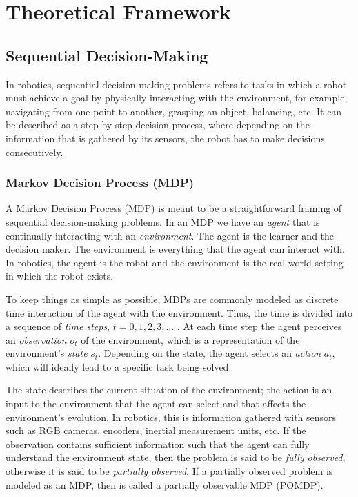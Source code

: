 \chapter{Theoretical Framework}
\section{Sequential Decision-Making}
In robotics, sequential decision-making problems refers to tasks in which a robot must achieve a goal by physically interacting with the environment, for example, navigating from one point to another, grasping an object, balancing, etc. It can be described as a step-by-step decision process, where depending on the information that is gathered by its sensors, the robot has to make decisions consecutively.

\subsection{Markov Decision Process (MDP) \cite{puterman2014markov, sutton2018reinforcement}}
A Markov Decision Process (MDP) is meant to be a straightforward framing of sequential decision-making problems. In an MDP we have an \emph{agent} that is continually interacting with an \emph{environment}. The agent is the learner and the decision maker. The environment is everything that the agent can interact with. In robotics, the agent is the robot and the environment is the real world setting in which the robot exists.

To keep things as simple as possible, MDPs are commonly modeled as discrete time interaction of the agent with the environment. Thus, the time is divided into a sequence of \emph{time steps}, $t=0,1,2,3,...$ . At each time step the agent perceives an \emph{observation} $o_{t}$ of the environment, which is a representation of the environment's \emph{state} $s_{t}$. Depending on the state, the agent selects an \emph{action} $a_{t}$, which will ideally lead to a specific task being solved. 

The state describes the current situation of the environment; the action is an input to the environment that the agent can select and that affects the environment's evolution. In robotics, this is information gathered with sensors such as RGB cameras, encoders, inertial measurement units, etc. If the observation contains sufficient information such that the agent can fully understand the environment state, then the problem is said to be \emph{fully observed}, otherwise it is said to be \emph{partially observed}. If a partially observed problem is modeled as an MDP, then is called a partially observable MDP (POMDP).


